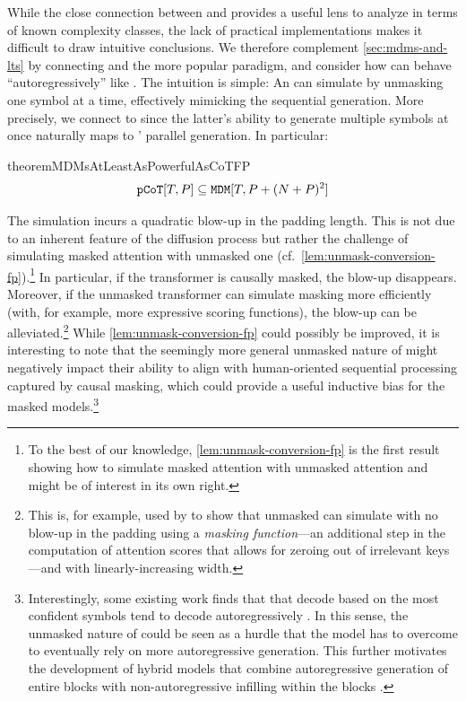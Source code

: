 \documentclass{article} %
\begin{document}
While the close connection between \MDMsAcr and \LTsAcr provides a useful lens to analyze \MDMsAcr in terms of known complexity classes, the lack of practical \LTAcr implementations makes it difficult to draw intuitive conclusions.
We therefore complement \cref{sec:mdms-and-lts} by connecting \MDMsAcr and the more popular \CoTAcr paradigm,
and consider how \MDMAcr can behave ``autoregressively'' like \CoTAcr.
The intuition is simple: An \MDMAcr can simulate \CoTAcr by unmasking one symbol at a time, effectively mimicking the sequential generation.
More precisely, we connect \MDMsAcr to \pCoTAcr since the latter's ability to generate multiple symbols at once naturally maps to \MDMsAcr' parallel generation.
In particular:
\begin{restatable}{theorem}{MDMsAtLeastAsPowerfulAsCoTFP} \label{thm:mdms-can-simulate-cot}
   \begin{equation}
      {\mathtt{pCoT}}[{T}, {P}] \subseteq {\mathtt{MDM}}[{T}, {P} + ({{N}} + {P})^2]
   \end{equation}
\end{restatable}
The simulation incurs a quadratic blow-up in the padding length.
This is not due to an inherent feature of the diffusion process but rather the challenge of simulating masked attention with unmasked one (cf.~\cref{lem:unmask-conversion-fp}).\footnote{To the best of our knowledge, \cref{lem:unmask-conversion-fp} is the first result showing how to simulate masked attention with unmasked attention and might be of interest in its own right.} 
In particular, if the \MDMAcr transformer is causally masked, the blow-up disappears. 
Moreover, if the unmasked transformer can simulate masking more efficiently (with, for example, more expressive scoring functions), the blow-up can be alleviated.\footnote{This is, for example, used by \citet[][Thm 5.4]{saunshi2025reasoninglatentthoughtspower} to show that unmasked \LTsAcr can simulate \CoTAcr with no blow-up in the padding using a \emph{masking function}---an additional step in the computation of attention scores that allows for zeroing out of irrelevant keys---and with linearly-increasing width.}
While \cref{lem:unmask-conversion-fp} could possibly be improved, it is interesting to note that the seemingly more general unmasked
nature of \eMDMsAcr might negatively impact their ability to align with human-oriented sequential processing captured by causal masking, which could provide a useful inductive bias for the masked models.\footnote{Interestingly, some existing work finds that \MDMsAcr that decode based on the most confident symbols tend to decode autoregressively \citep{gong2025diffucoderunderstandingimprovingmasked}. In this sense, the unmasked nature of \MDMsAcr could be seen as a hurdle that the model has to overcome to eventually rely on more autoregressive generation. This further motivates the development of hybrid models that combine autoregressive generation of entire blocks with non-autoregressive infilling within the blocks \citep[][\textit{inter alia}]{nie2025largelanguagediffusionmodels,arriola2025blockdiffusioninterpolatingautoregressive,song2025seeddiffusionlargescalediffusion}.}
\end{document}
